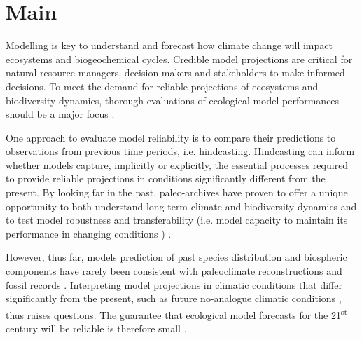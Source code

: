 \documentclass[pdflatex, sn-nature]{sn-jnl}%
\begin{document}
\maketitle

\newpage




\linenumbers
\section{Main}

Modelling is key to understand and forecast how climate change will impact ecosystems and biogeochemical cycles. Credible model projections are critical for natural resource managers, decision makers and stakeholders to make informed decisions. To meet the demand for reliable projections of ecosystems and biodiversity dynamics, thorough evaluations of ecological model performances should be a major focus \cite{Dawson2011, Mouquet2015, Pacifici2015}. 

One approach to evaluate model reliability is to compare their predictions to observations from previous time periods, i.e. hindcasting. Hindcasting can inform whether models capture, implicitly or explicitly, the essential processes required to provide reliable projections in conditions significantly different from the present. By looking far in the past, paleo-archives have proven to offer a unique opportunity to both understand long-term climate and biodiversity dynamics \cite{Fordham2020} and to test model robustness and transferability (i.e. model capacity to maintain its performance in changing conditions \cite{UribeRivera2023}) \cite{Braconnot2012, Maguire2015}.  

However, thus far, models prediction of past species distribution and biospheric components have rarely been consistent with paleoclimate reconstructions and fossil records \cite{Veloz2012, Pearman2008, Roberts2012, Foley2013, Maguire2016} . Interpreting model projections in climatic conditions that differ significantly from the present, such as future no-analogue climatic conditions \cite{Williams2007}, thus raises questions. The guarantee that ecological model forecasts for the 21\textsuperscript{st} century will be reliable is therefore small \cite{Fitzpatrick2018}. 
\end{document}
